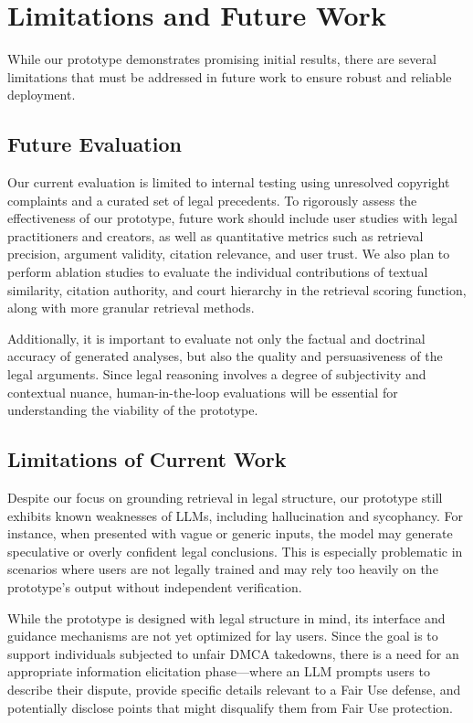 \section{Limitations and Future Work}

While our prototype demonstrates promising initial results, there are several limitations that must be addressed in future work to ensure robust and reliable deployment.

\subsection{Future Evaluation}

Our current evaluation is limited to internal testing using unresolved copyright complaints and a curated set of legal precedents. To rigorously assess the effectiveness of our prototype, future work should include user studies with legal practitioners and creators, as well as quantitative metrics such as retrieval precision, argument validity, citation relevance, and user trust. We also plan to perform ablation studies to evaluate the individual contributions of textual similarity, citation authority, and court hierarchy in the retrieval scoring function, along with more granular retrieval methods.

Additionally, it is important to evaluate not only the factual and doctrinal accuracy of generated analyses, but also the quality and persuasiveness of the legal arguments. Since legal reasoning involves a degree of subjectivity and contextual nuance, human-in-the-loop evaluations will be essential for understanding the viability of the prototype.

\subsection{Limitations of Current Work}

Despite our focus on grounding retrieval in legal structure, our prototype still exhibits known weaknesses of LLMs, including hallucination and sycophancy. For instance, when presented with vague or generic inputs, the model may generate speculative or overly confident legal conclusions. This is especially problematic in scenarios where users are not legally trained and may rely too heavily on the prototype’s output without independent verification.

While the prototype is designed with legal structure in mind, its interface and guidance mechanisms are not yet optimized for lay users. Since the goal is to support individuals subjected to unfair DMCA takedowns, there is a need for an appropriate information elicitation phase—where an LLM prompts users to describe their dispute, provide specific details relevant to a Fair Use defense, and potentially disclose points that might disqualify them from Fair Use protection.

